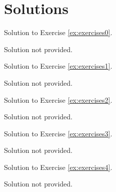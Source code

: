 
\newpage
\section*{Solutions}
Solution to Exercise \ref{ex:exercises0}.


    Solution not provided.
    

\newpage

Solution to Exercise \ref{ex:exercises1}.


    Solution not provided.
    

\newpage

Solution to Exercise \ref{ex:exercises2}.


    Solution not provided.
    

\newpage

Solution to Exercise \ref{ex:exercises3}.


    Solution not provided.
    

\newpage

Solution to Exercise \ref{ex:exercises4}.


    Solution not provided.
    
